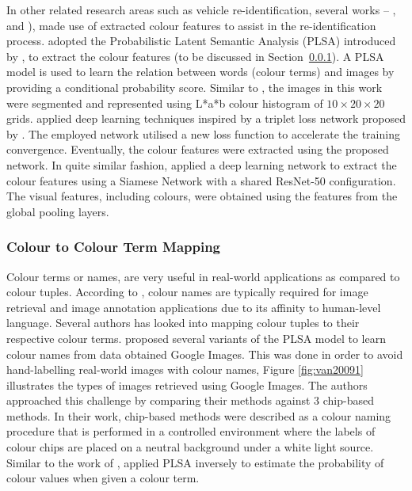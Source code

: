In other related research areas such as vehicle re-identification, several works -- \cite{liu2016deep}, \cite{liu2016deep2} and \cite{shen2017learning}), made use of extracted colour features to assist in the re-identification process.  adopted the Probabilistic Latent Semantic Analysis (PLSA) introduced by , to extract the colour features (to be discussed in Section~\ref{sec:color2colorterm}). A PLSA model is used to learn the relation between words (colour terms) and images by providing a conditional probability score. Similar to \cite{kim2008deciding}, the images in this work were segmented and represented using L*a*b colour histogram of $10 \times 20 \times 20$ grids.  applied deep learning techniques inspired by a triplet loss network proposed by . The employed network utilised a new loss function to accelerate the training convergence. Eventually, the colour features were extracted using the proposed network. In quite similar fashion,  applied a deep learning network to extract the colour features using a Siamese Network with a shared ResNet-50 configuration. The visual features, including colours, were obtained using the features from the global pooling layers.

\subsubsection{Colour to Colour Term Mapping}
\label{sec:color2colorterm}

Colour terms or names, are very useful in real-world applications as compared to colour tuples. According to \cite{van2009learning}, colour names are typically required for image retrieval and image annotation applications due to its affinity to human-level language. Several authors has looked into mapping colour tuples to their respective colour terms.  proposed several variants of the PLSA model to learn colour names from data obtained Google Images. This was done in order to avoid hand-labelling real-world images with colour names, Figure \ref{fig:van20091} illustrates the types of images retrieved using Google Images. The authors approached this challenge by comparing their methods against 3 chip-based methods. In their work, chip-based methods were described as a colour naming procedure that is performed in a controlled environment where the labels of colour chips are placed on a neutral background under a white light source. Similar to the work of ,  applied PLSA inversely to estimate the probability of colour values when given a colour term.


